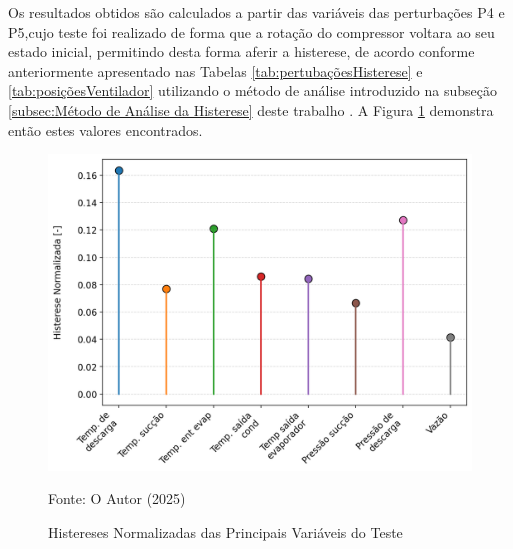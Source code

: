  Os resultados obtidos são calculados a partir das variáveis das perturbações P4 e P5,cujo teste foi realizado de forma que a rotação do compressor voltara ao seu estado inicial, permitindo desta forma aferir a histerese, de acordo conforme anteriormente apresentado nas Tabelas \ref{tab:pertubaçõesHisterese} e \ref{tab:posiçõesVentilador} utilizando o método de análise introduzido na subseção \ref{subsec:Método de Análise da Histerese} deste trabalho . A Figura \ref{fig:histereses normalizadas} demonstra então estes valores encontrados.
 \newpage
\begin{figure}[h] 

    \centering
    \includegraphics[width=1\linewidth]{FigurasdoTexto/Histereses Normalizadas.png}
    \caption{Histereses Normalizadas das Principais Variáveis do Teste}
    \label{fig:histereses normalizadas}
    {\footnotesize Fonte: O Autor (2025)}
\end{figure}

